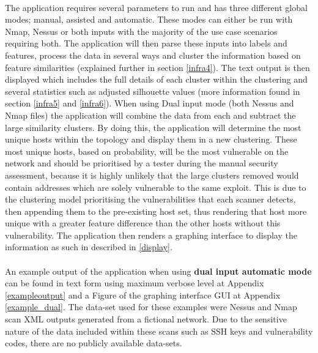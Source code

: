 \paragraph{}The application requires several parameters to run and has three different global modes; manual, assisted and automatic. These modes can either be run with Nmap, Nessus or both inputs with the majority of the use case scenarios requiring both. The application will then parse these inputs into labels and features, process the data in several ways and cluster the information based on feature similarities (explained further in section \ref{infra4}). The text output is then displayed which includes the full details of each cluster within the clustering and several statistics such as adjusted silhouette values (more information found in section \ref{infra5} and \ref{infra6}). When using Dual input mode (both Nessus and Nmap files) the application will combine the data from each and subtract the large similarity clusters. By doing this, the application will determine the most unique hosts within the topology and display them in a new clustering. These most unique hosts, based on probability, will be the most vulnerable on the network and should be prioritised by a tester during the manual security assessment, because it is highly unlikely that the large clusters removed would contain addresses which are solely vulnerable to the same exploit. This is due to the clustering model prioritising the vulnerabilities that each scanner detects, then appending them to the pre-existing host set, thus rendering that host more unique with a greater feature difference than the other hosts without this vulnerability. The application then renders a graphing interface to display the information as such in described in \ref{display}.

\paragraph{}An example output of the application when using \textbf{dual input automatic mode} can be found in text form using maximum verbose level at Appendix \ref{exampleoutput} and a Figure of the graphing interface GUI at Appendix \ref{example_dual}. The data-set used for these examples were Nessus and Nmap scan XML outputs generated from a fictional network. Due to the sensitive nature of the data included within these scans such as SSH keys and vulnerability codes, there are no publicly available data-sets.\linebreak

